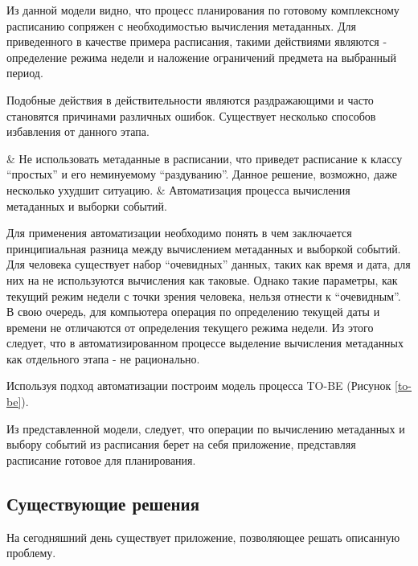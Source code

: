
Из данной модели видно, что процесс планирования по готовому комплексному расписанию сопряжен с необходимостью вычисления метаданных.
Для приведенного в качестве примера расписания, такими действиями являются - определение режима недели и наложение ограничений предмета на выбранный период.

Подобные действия в действительности являются раздражающими и часто становятся причинами различных ошибок.
Существует несколько способов избавления от данного этапа.

\begin{easylist}
  & Не использовать метаданные в расписании, что приведет расписание к классу “простых” и его неминуемому “раздуванию”. Данное решение, возможно, даже несколько ухудшит ситуацию.
  & Автоматизация процесса вычисления метаданных и выборки событий.
\end{easylist}

Для применения автоматизации необходимо понять в чем заключается принципиальная разница между вычислением метаданных и выборкой событий.
Для человека существует набор “очевидных” данных, таких как время и дата, для них на не используются вычисления как таковые.
Однако такие параметры, как текущий режим недели с точки зрения человека, нельзя отнести к “очевидным”.
В свою очередь, для компьютера операция по определению текущей даты и времени не отличаются от определения текущего режима недели.
Из этого следует, что в автоматизированном процессе выделение вычисления метаданных как отдельного этапа - не рационально.

Используя подход автоматизации построим модель процесса TO-BE (Рисунок \ref{to-be}).


Из представленной модели, следует, что операции по вычислению метаданных и выбору событий из расписания берет на себя приложение, представляя расписание готовое для планирования.

\subsection{Существующие решения}

На сегодняшний день существует приложение, позволяющее решать описанную проблему.

